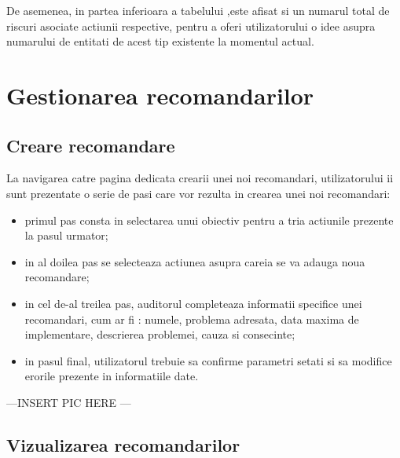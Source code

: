 De asemenea, in partea inferioara a tabelului ,este afisat si un numarul total de riscuri asociate actiunii respective, pentru a oferi utilizatorului o idee asupra numarului de entitati de acest tip existente la momentul actual. 



\section{Gestionarea recomandarilor}

\subsection*{Creare recomandare}
La navigarea catre pagina dedicata crearii unei noi recomandari, utilizatorului ii sunt prezentate o serie de pasi care vor rezulta in crearea unei noi recomandari:
	
	\begin{itemize}
		\item primul pas consta in selectarea unui obiectiv pentru a tria actiunile prezente la pasul urmator;
		
		\item in al doilea pas se selecteaza actiunea asupra careia se va adauga noua recomandare;
		
		\item in cel de-al treilea pas, auditorul completeaza informatii specifice unei recomandari, cum ar fi : numele, problema adresata, data maxima de implementare, descrierea problemei, cauza si consecinte;
		
		\item in pasul final, utilizatorul trebuie sa confirme parametri setati si sa modifice erorile prezente in informatiile date.
	\end{itemize}

---INSERT PIC HERE --- 


\subsection*{Vizualizarea recomandarilor}

